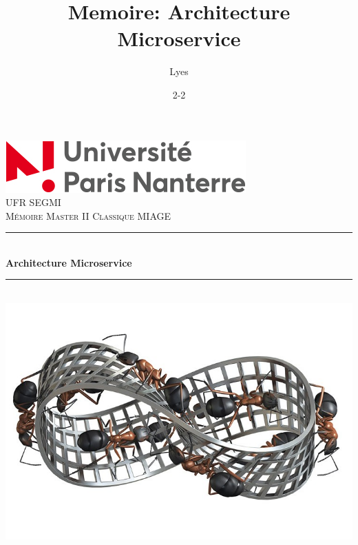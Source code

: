\documentclass[12pt, a4paper, openany]{report}
\title{Memoire: Architecture Microservice}
\author{Lyes \bsc{Kherbiche}}
\date{2-2}
\newcommand{\HRule}{\rule{\linewidth}{0.5mm}}
\begin{document}

\makeatletter
  \begin{titlepage}
  
      
      
      
      
  \begin{sffamily}
   \begin{center}

    \includegraphics[scale=0.5]{parisx.jpg}~\\[1.5cm]

    \textsc{\LARGE UFR SEGMI }\\[2cm]

    \textsc{\Large Mémoire Master II Classique MIAGE}\\[1.5cm]

    \HRule \\[0.4cm]
    { \huge \bfseries Architecture Microservice\\[0.4cm] }

    \HRule \\[2cm]
    \includegraphics[scale=0.3]{fourmies.jpg}
    \\[2cm]


\end{center}
\end{sffamily}
\end{titlepage}
\end{document}
